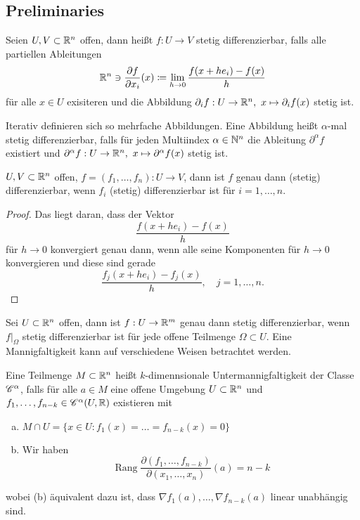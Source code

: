 \subsection*{Preliminaries}
\begin{defn}
    Seien $U,V\subset \mathbb{R}^n$ offen, dann heißt $f:U\to V$ stetig differenzierbar, falls alle partiellen Ableitungen 
    \[
    \mathbb{R}^n\ni \frac{\partial f}{\partial x_i}(x) \coloneqq \lim_{h\to 0}\frac{f(x+he_i)-f(x)}{h}    
    \] 
    für alle $x\in U$ exisiteren und die Abbildung $\partial_i f: U \to \mathbb{R}^n, \ x\mapsto \partial_i f(x)$ stetig ist. 
\end{defn}
Iterativ definieren sich so mehrfache Abbildungen. Eine Abbildung heißt $\alpha$-mal stetig differenzierbar, falls für jeden Multiindex
$\alpha\in \mathbb{N}^n$ die Ableitung $\partial^\alpha f$ existiert und $\partial^\alpha f: U \to \mathbb{R}^n, \ x\mapsto \partial^\alpha f(x)$ stetig ist.
\begin{lemma}
    $U,V\subset \mathbb{R}^n$ offen, $f=(f_1,\ldots,f_n):U \to V$, dann ist $f$ genau dann (stetig) differenzierbar, wenn $f_i$ (stetig) differenzierbar ist für $i=1,\ldots,n$. 
\end{lemma}
\begin{proof}
    Das liegt daran, dass der Vektor
    \[
    \frac{f(x+he_i)-f(x)}{h}    
    \]
    für $h\to 0$ konvergiert genau dann, wenn alle seine Komponenten für $h\to 0$ konvergieren und diese sind gerade 
    \[
    \frac{f_j(x+he_i)-f_j(x)}{h}, \quad j=1,\ldots,n.    
    \]
\end{proof}
Sei $U\subset \mathbb{R}^n$ offen, dann ist $f:U\to \mathbb{R}^m$ genau dann stetig differenzierbar, wenn $f\vert_\Omega$ stetig differenzierbar ist für jede offene Teilmenge $\Omega\subset U$. 
\newpage
Eine Mannigfaltigkeit kann auf verschiedene Weisen betrachtet werden. 
\begin{defn}
    Eine Teilmenge $M\subset \mathbb{R}^n$ heißt $k$-dimennsionale Untermannigfaltigkeit
    der Classe $\mathscr{C}^\alpha$, falls für alle $a\in M$ eine offene Umgebung $U\subset \mathbb{R}^n$ und
    $f_1,\ldots,f_{n-k}\in \mathscr{C}^\alpha(U,\mathbb{R})$ existieren mit 
    \begin{enumerate}[(a)]
        \item $M\cap U = \{ x\in U : f_1(x)=\ldots=f_{n-k}(x)=0\}$
        \item Wir haben \[\operatorname{Rang}\frac{\partial(f_1,\ldots,f_{n-k})}{\partial(x_1,\ldots,x_n)}(a)=n-k\]
    \end{enumerate}
    wobei (b) äquivalent dazu ist, dass $\nabla f_1(a),\ldots,\nabla f_{n-k}(a)$ linear unabhängig sind. 
\end{defn}
